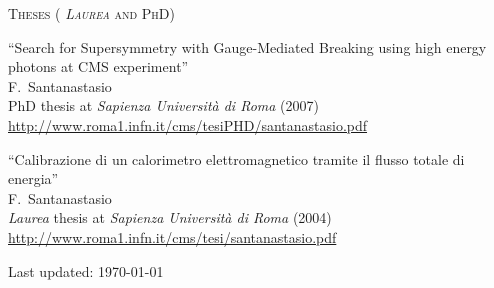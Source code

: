 \documentclass[10pt, a4paper]{article}
\begin{document}
\begin{thebibliography}{599}

\vspace{0.1cm} \begin{center} \textsc{Theses ( \textit{Laurea} and PhD)} \end{center} \vspace{0.05cm}

``Search for Supersymmetry with Gauge-Mediated Breaking using high energy photons at CMS experiment''
  \\{}F.~Santanastasio
  \\{}PhD thesis at \textit{Sapienza Universit\`a di Roma} (2007)
 \\{}\href{http://www.roma1.infn.it/cms/tesiPHD/santanastasio.pdf}{http://www.roma1.infn.it/cms/tesiPHD/santanastasio.pdf}

``Calibrazione di un calorimetro elettromagnetico tramite il flusso totale di energia''
  \\{}F.~Santanastasio
  \\{}\textit{Laurea} thesis at \textit{Sapienza Universit\`a di Roma} (2004)
  \\{}\href{http://www.roma1.infn.it/cms/tesi/santanastasio.pdf}{http://www.roma1.infn.it/cms/tesi/santanastasio.pdf}


\end{thebibliography}

\vfill{}
\hrulefill

\begin{center}
{\footnotesize Last updated: \today}
\end{center}
\end{document}
